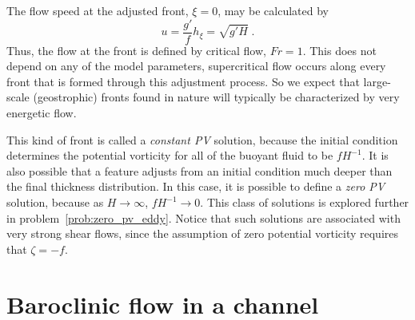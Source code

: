 \documentclass[11pt]{report}
\numberwithin{equation}{section}
\begin{document}
The flow speed at the adjusted front, $\xi = 0$, may be calculated by
\begin{equation}
    u = \frac{g'}{f} h_\xi = \sqrt{g' H} \; .
\end{equation}
Thus, the flow at the front is defined by critical flow, $Fr = 1$.  This does not depend on any of the model parameters, supercritical flow occurs along every front that is formed through this adjustment process.  So we expect that large-scale (geostrophic) fronts found in nature will typically be characterized by very energetic flow.

This kind of front is called a \emph{constant PV} solution, because the initial condition determines the potential vorticity for all of the buoyant fluid to be $f H^{-1}$.  It is also possible that a feature adjusts from an initial condition much deeper than the final thickness distribution.  In this case, it is possible to define a \emph{zero PV} solution, because as $H \rightarrow \infty$, $f H^{-1} \rightarrow 0$.  This class of solutions is explored further in problem~\ref{prob:zero_pv_eddy}.  Notice that such solutions are associated with very strong shear flows, since the assumption of zero potential vorticity requires that $\zeta = -f$.



\section{Baroclinic flow in a channel}
\end{document}
